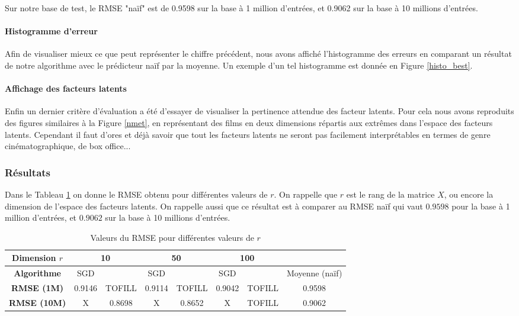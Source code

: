 \documentclass[10pt,a4paper]{article}
\begin{document}
 Sur notre base de test, le RMSE "naïf" est de 0.9598 sur la base à 1 million d'entrées, et 0.9062 sur la base à 10 millions d'entrées.

\paragraph{Histogramme d'erreur} Afin de visualiser mieux ce que peut représenter le chiffre précédent, nous avons affiché l'histogramme des erreurs en comparant un résultat de notre algorithme avec le prédicteur naïf par la moyenne. Un exemple d'un tel histogramme est donnée en Figure \ref{histo_best}.

\paragraph{Affichage des facteurs latents}

Enfin un dernier critère d'évaluation a été d'essayer de visualiser la pertinence attendue des facteur latents. Pour cela nous avons reproduits des figures similaires à la Figure \ref{nmet}, en représentant des films en deux dimensions répartis aux extrêmes dans l'espace des facteurs latents. Cependant il faut d'ores et déjà savoir que tout les facteurs latents ne seront pas facilement interprétables en termes de genre cinématographique, de box office...

\subsubsection*{Résultats}

Dans le Tableau \ref{RMSE_vs_r} on donne le RMSE obtenu pour différentes valeurs de $r$. On rappelle que $r$ est le rang de la matrice $X$, ou encore la dimension de l'espace des facteurs latents. On rappelle aussi que ce résultat est à comparer au RMSE naïf qui vaut $0.9598$ pour la base à 1 million d'entrées, et $0.9062$ sur la base à 10 millions d'entrées.

\begin{table}[h]
\begin{center}
   \begin{tabular}{|c|c|c|c|c|c|c|c|}
  	\hline
  	\textbf{Dimension $r$} & \multicolumn{2}{c|}{10} & \multicolumn{2}{c|}{50} & \multicolumn{2}{c|}{100}& \\
  	\hline
  	\textbf{Algorithme} & SGD & \jel & SGD & \jel & SGD & \jel & Moyenne (naïf) \\
  	\hline
  	\textbf{RMSE (1M)}  & 0.9146  & TOFILL & 0.9114 & TOFILL & 0.9042 & TOFILL & 0.9598\\
  	\hline
  	\textbf{RMSE (10M)}  & X  & 0.8698 & X & 0.8652 & X & TOFILL & 0.9062\\
  	\hline
\end{tabular}
\end{center}
\caption{\label{RMSE_vs_r} Valeurs du RMSE pour différentes valeurs de $r$}
\end{table}
\end{document}
